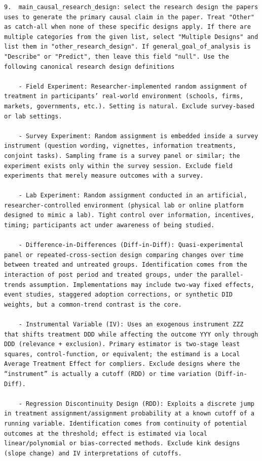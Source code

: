 \documentclass[12pt]{article}
\begin{document}
{\begin{Verbatim}[breaklines=true]
9.  main_causal_research_design: select the research design the papers uses to generate the primary causal claim in the paper. Treat "Other" as catch‑all when none of these specific designs apply. If there are multiple categories from the given list, select "Multiple Designs" and list them in "other_research_design". If general_goal_of_analysis is "Describe" or "Predict", then leave this field "null". Use the following canonical research design definitions

    - Field Experiment: Researcher‐implemented random assignment of treatment in participants’ real-world environment (schools, firms, markets, governments, etc.). Setting is natural. Exclude survey-based or lab settings.

    - Survey Experiment: Random assignment is embedded inside a survey instrument (question wording, vignettes, information treatments, conjoint tasks). Sampling frame is a survey panel or similar; the experiment exists only within the survey session. Exclude field experiments that merely measure outcomes with a survey.

    - Lab Experiment: Random assignment conducted in an artificial, researcher-controlled environment (physical lab or online platform designed to mimic a lab). Tight control over information, incentives, timing; participants act under awareness of being studied.

    - Difference-in-Differences (Diff-in-Diff): Quasi-experimental panel or repeated-cross-section design comparing changes over time between treated and untreated groups. Identification comes from the interaction of post period and treated groups, under the parallel-trends assumption. Implementations may include two-way fixed effects, event studies, staggered adoption corrections, or synthetic DID weights, but a common-trend contrast is the core.

    - Instrumental Variable (IV): Uses an exogenous instrument ZZZ that shifts treatment DDD while affecting the outcome YYY only through DDD (relevance + exclusion). Primary estimator is two-stage least squares, control-function, or equivalent; the estimand is a Local Average Treatment Effect for compliers. Exclude designs where the “instrument” is actually a cutoff (RDD) or time variation (Diff-in-Diff).

    - Regression Discontinuity Design (RDD): Exploits a discrete jump in treatment assignment/assignment probability at a known cutoff of a running variable. Identification comes from continuity of potential outcomes at the threshold; effect is estimated via local linear/polynomial or bias-corrected methods. Exclude kink designs (slope change) and IV interpretations of cutoffs.


\end{Verbatim}}
\end{document}
